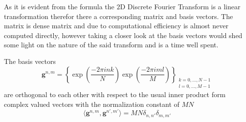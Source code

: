 As it is evident from the formula the $2$D Discrete Fourier Transform is a linear transformation therefor 
there a corresponding matrix and basis vectors. The matrix is dense matrix and due to computational efficiency 
is almost never computed directly, however taking a closer look at the basis vectors would shed some light on 
the nature of the said transform and is a time well spent.

\begin{Prop}\label{Prop:2ddftbasisvectors}
    The basis vectors
    \begin{equation}\label{eq:2ddftbasisvectors}
        \boldsymbol{g}^{n,m} = \left\{\exp\left({\frac{-2\pi ink}{N}}\right)\exp\left({\frac{-2\pi iml}{M}}\right)\right\}_{\substack{k=0,\ldots,N-1\\l=0,\ldots,M-1}}
    \end{equation}
    are orthogonal to each other with respect to the usual inner product form complex valued vectors 
    with the normalization constant of $MN$
    \begin{equation}
        \langle\boldsymbol{g}^{n,m},\boldsymbol{g}^{n',m'}\rangle= MN \delta_{n,n'}\delta_{m,m'}
    \end{equation}
\end{Prop}

